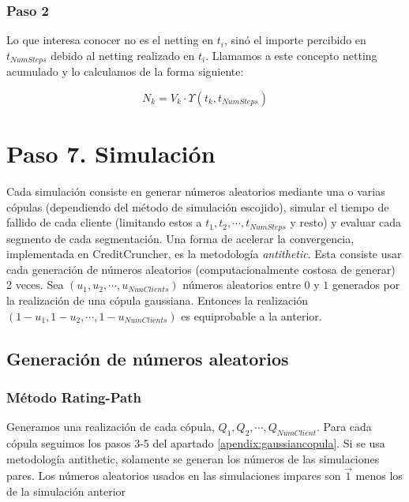 \subsubsection{Paso 2}

Lo que interesa conocer no es el netting en $t_i$, sin\'o el importe
percibido en $t_{NumSteps}$ debido al netting realizado en $t_i$.
Llamamos a este concepto netting acumulado y lo calculamos de la
forma siguiente:

\begin{displaymath}
N_k =  V_k \cdot \Upsilon(t_k,t_{NumSteps})
\end{displaymath}


\section{Paso 7. Simulaci\'on}

Cada simulaci\'on consiste en generar n\'umeros aleatorios
mediante una o varias c\'opulas (dependiendo del m\'etodo de
simulaci\'on escojido), simular el tiempo de fallido de cada
cliente (limitando estos a $t_1, t_2, \cdots, t_{NumSteps}$ y
resto) y evaluar cada segmento de cada segmentaci\'on.
\newline
\newline
Una forma de acelerar la convergencia, implementada en CreditCruncher,
es la metodolog\'ia \emph{antithetic}. Esta consiste
usar cada generaci\'on de n\'umeros aleatorios (computacionalmente
costosa de generar) 2 veces. Sea $(u_1, u_2, \cdots, u_{NunClients})$
n\'umeros aleatorios entre $0$ y $1$ generados por la realizaci\'on
de una c\'opula gaussiana. Entonces la realizaci\'on
$(1-u_1, 1-u_2, \cdots, 1-u_{NumClients})$ es equiprobable a la anterior.

\subsection{Generaci\'on de n\'umeros aleatorios}

\subsubsection{M\'etodo Rating-Path}

Generamos una realizaci\'on de cada c\'opula, $Q_1, Q_2, \cdots, Q_{NumClient}$.
Para cada c\'opula seguimos los pasos 3-5 del apartado \ref{apendix:gaussiancopula}.
\newline
\newline
Si se usa metodolog\'ia antithetic, solamente se generan los n\'umeros
de las simulaciones pares. Los n\'umeros aleatorios usados en las simulaciones
impares son $\vec{1}$ menos los de la simulaci\'on anterior 

